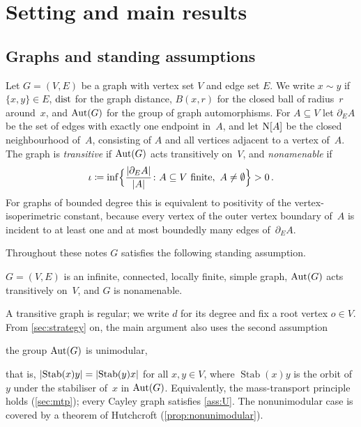 \section{Setting and main results}\label{sec:setting}

\subsection{Graphs and standing assumptions}\label{sec:graphs}

Let $G=(V,E)$ be a graph with vertex set $V$ and edge set $E$. We write $x\sim y$ if $\{x,y\}\in E$,
$\operatorname{dist}$ for the graph distance, $B(x,r)$ for the closed ball of radius~$r$ around~$x$, and
$\operatorname{Aut}(G)$ for the group of graph automorphisms. For $A\subseteq V$ let $\partial_E A$ be the set of
edges with exactly one endpoint in~$A$, and let $\mathrm{N}[A]$ be the closed neighbourhood of~$A$, consisting
of $A$ and all vertices adjacent to a vertex of~$A$. The graph is \emph{transitive} if $\operatorname{Aut}(G)$ acts
transitively on~$V$, and \emph{nonamenable} if
\begin{equation*}
  \iota \coloneqq \inf\Bigl\{\frac{\lvert\partial_E A\rvert}{\lvert A\rvert} \colon A\subseteq V \text{ finite},\ A\neq\emptyset\Bigr\} > 0\,.
\end{equation*}
For graphs of bounded degree this is equivalent to positivity of the vertex-isoperimetric constant,
because every vertex of the outer vertex boundary of~$A$ is incident to at least one and at most
boundedly many edges of~$\partial_E A$.

Throughout these notes $G$ satisfies the following standing assumption.

\begin{asslist}
  \item\label{ass:G} $G=(V,E)$ is an infinite, connected, locally finite, simple graph, $\operatorname{Aut}(G)$ acts
  transitively on~$V$, and $G$ is nonamenable.
\end{asslist}

\noindent A transitive graph is regular; we write $d$ for its degree and fix a root vertex $o\in V$.
From \cref{sec:strategy} on, the main argument also uses the second assumption
\begin{asslist}[resume]
  \item\label{ass:U} the group $\operatorname{Aut}(G)$ is unimodular,
\end{asslist}
\noindent that is, $\lvert\operatorname{Stab}(x)y\rvert=\lvert\operatorname{Stab}(y)x\rvert$ for all $x,y\in V$, where
$\operatorname{Stab}(x)y$ is the orbit of $y$ under the stabiliser of~$x$ in $\operatorname{Aut}(G)$. Equivalently, the
mass-transport principle holds (\cref{sec:mtp}); every Cayley graph satisfies \cref{ass:U}. The
nonunimodular case is covered by a theorem of Hutchcroft (\cref{prop:nonunimodular}).


